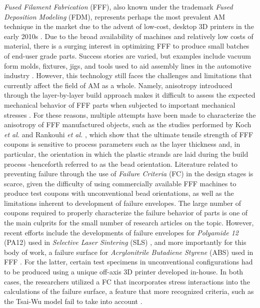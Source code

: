 \documentclass[main.tex]{subfiles}
\begin{document}
\emph{Fused Filament Fabrication} (FFF), also known under the trademark \emph{Fused Deposition Modeling} (FDM\texttrademark), represents perhaps the most prevalent AM technique in the market due to the advent of low-cost, desktop 3D printers in the early 2010s \cite{Capote2017}. Due to the broad availability of machines and relatively low costs of material, there is a surging interest in optimizing FFF to produce small batches of end-user grade parts. Success stories are varied, but examples include vacuum form molds, fixtures, jigs, and tools used to aid assembly lines in the automotive industry \cite{Hartman2014, VanHulle2017,deVries2017}. However, this technology still faces the challenges and limitations that currently affect the field of AM as a whole. Namely, anisotropy introduced through the layer-by-layer build approach makes it difficult to assess the expected mechanical behavior of FFF parts when subjected to important mechanical stresses \cite{Capote2017}. For these reasons, multiple attempts have been made to characterize the anisotropy of FFF manufactured objects, such as the studies performed by Koch \emph{et al.} \cite{Koch2017} and Rankouhi \emph{et al.} \cite{Rankouhi2016}, which show that the ultimate tensile strength of FFF coupons is sensitive to process parameters such as the layer thickness and, in particular, the orientation in which the plastic strands are laid during the build process -henceforth referred to as the bead orientation. Literature related to preventing failure through the use of \emph{Failure Criteria} (FC) in the design stages is scarce, given the difficulty of using commercially available FFF machines to produce test coupons with unconventional bead orientations, as well as the limitations inherent to development of failure envelopes. The large number of coupons required to properly characterize the failure behavior of parts is one of the main culprits for the small number of research articles on the topic. However, recent efforts include the developments of failure envelopes for \emph{Polyamide 12} (PA12) used in \emph{Selective Laser Sintering} (SLS) \cite{Obst2018}, and more importantly for this body of work, a failure surface for \emph{Acrylonitrile Butadiene Styrene} (ABS) used in FFF \cite{MazzeiCapote2019}. For the latter, certain test specimens in unconventional configurations had to be produced using a unique off-axis 3D printer developed in-house. In both cases, the researchers utilized a FC that incorporates stress interactions into the calculations of the failure surface, a feature that more recognized criteria, such as the Tsai-Wu model fail to take into account \cite{Osswald2017a}.
\end{document}
